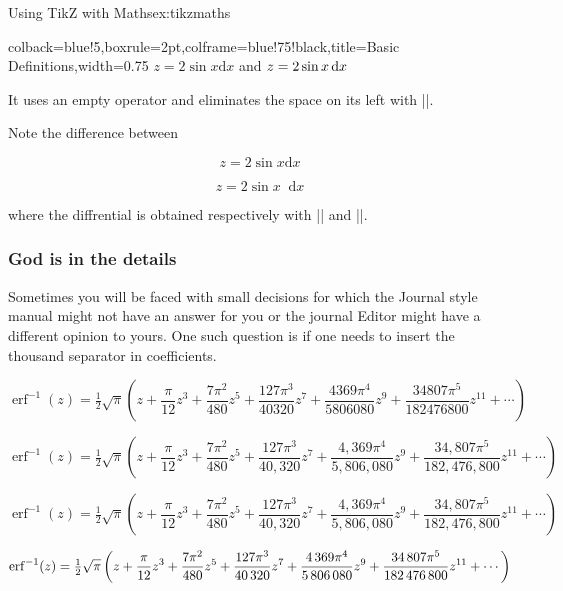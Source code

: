 {\begin{texexample}{Using TikZ with Maths}{ex:tikzmaths}
\end{texexample}



\begin{tcblisting}{colback=blue!5,boxrule=2pt,colframe=blue!75!black,title=Basic Definitions,width=0.75\textwidth}
\newcommand{\ud}{\ensuremath \mathop{}\!\mathrm{d}}
\(z=2\sin x\mathrm{d}x\) and \(z=2\sin x\ud x\)
\end{tcblisting}
\newcommand{\ud}{\mathop{}\!\mathrm{d}}
\bigskip

It uses an empty operator and eliminates the space
on its left with |\!|.

Note the difference between

\[z=2\sin x\mathrm{d}x  \]

\[z=2\sin x\ud x\]

where the diffrential is obtained respectively with
|| and |\ud|.




\subsubsection{God is in the details}

Sometimes you will be faced with small decisions for which the Journal style manual might not have an answer for you or the journal Editor might have a different opinion to yours. One such question is if one needs to insert the thousand separator in coefficients.

\[
\operatorname{erf}^{-1}(z)=\tfrac{1}{2}\sqrt{\pi}\left (z+\frac{\pi}{12}z^3+\frac{7\pi^2}{480}z^5+\frac{127\pi^3}{40320}z^7+\frac{4369\pi^4}{5806080}z^9+\frac{34807\pi^5}{182476800}z^{11}+\cdots\right )
\]


\[
\operatorname{erf}^{-1}(z)=\tfrac{1}{2}\sqrt{\pi}\left (z+\frac{\pi}{12}z^3+\frac{7\pi^2}{480}z^5+\frac{127\pi^3}{40,320}z^7+\frac{4,369\pi^4}{5,806,080}z^9+\frac{34,807\pi^5}{182,476,800}z^{11}+\cdots\right )
\]

\[
\operatorname{erf}^{-1}(z)=\tfrac{1}{2}\sqrt{\pi}\left (z+\frac{\pi}{12}z^3+\frac{7\pi^2}{480}z^5+\frac{127\pi^3}{40{,}320}z^7+\frac{4{,}369\pi^4}{5{,}806{,}080}z^9+\frac{34{,}807\pi^5}{182{,}476,800}z^{11}+\cdots\right )
\]



\[
\operatorname{erf}^{-1}(z)=\tfrac{1}{2}\sqrt{\pi}\left (z+\frac{\pi}{12}z^3+\frac{7\pi^2}{480}z^5+\frac{127\pi^3}{40\thinspace 320}z^7+\frac{4\thinspace 369\pi^4}{5\thinspace 806\thinspace 080}z^9+\frac{34\thinspace 807\pi^5}{182\thinspace 476\thinspace 800}z^{11}+\cdots\right )
\]


}
